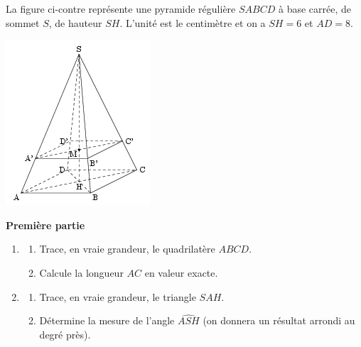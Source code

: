

La figure ci-contre représente une pyramide
régulière $SABCD$ à base carrée, de sommet $S$, de hauteur
$SH$. L'unité est le centimètre et on a $SH=6$ et $AD=8$.

\includegraphics[scale=1]{RepS-45.png} 

\textbf{Première partie}
\begin{enumerate}
\item
\begin{enumerate}
\item Trace, en vraie grandeur, le quadrilatère $ABCD$.
\item Calcule la longueur $AC$ en valeur exacte.
\end{enumerate}
\item
\begin{enumerate}
\item Trace, en vraie grandeur, le triangle $SAH$.
\item Détermine la mesure de l'angle $\widehat{ASH}$ (on donnera un
résultat arrondi au degré près).
\end{enumerate}
\end{enumerate}



